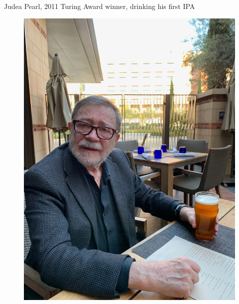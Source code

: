 \documentclass{beamer}
\begin{document}
\begin{frame}{Judea Pearl, 2011 Turing Award winner, drinking his first IPA}

  \begin{figure}
    \includegraphics[scale=0.05]{./lecture_includes/pearl_ipa.jpg}
  \end{figure}

\end{frame}
\end{document}

